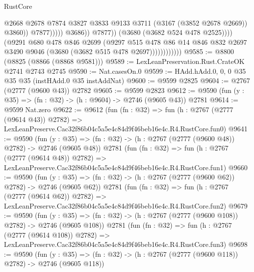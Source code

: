 \begin{lexlean}{RustCore}
\begin{coremodule}
                                              @2668
                                              @2678
                                              @7874
                                              @3827
                                              @3833
                                              @9133
                                              @3711
                                              (@3167 (@3852 @2678 @2669))
                                              @3860))
                                          @7877)))))
                                @3686))
                            @7877))
                        (@3680 (@3682 @524 @478 @2525))))
                    (@9291
                      @680
                      @478
                      @846
                      @2699
                      (@9297
                        @515
                        @478
                        @86
                        @14
                        @846
                        @832
                        @2697
                        @3490
                        @9046
                        (@3680 (@3682 @515 @478 @2697))))))))))))
@9585 := @8800 (@8825 (@8866 (@8868 @9581)))
@9589 := LexLeanPreservation.Rust.CrateOK @2741 @2743 @2745
@9590 := Nat.casesOn.{0}
@9599 := HAdd.hAdd.{0, 0, 0} @35 @35 @35 (instHAdd.{0} @35 instAddNat)
@9600 := @9599 @2825
@9604 := @2767 (@2777 (@9600 @43)) @2782
@9605 := @9599 @2823
@9612 := @9590 (fun (y : @35) => (fn : @32) -> (h : @9604) -> @2746 (@9605 @43)) @2781
@9614 := @9599 Nat.zero
@9622 := @9612
    (fun (fn : @32) =>
    fun (h : @2767 (@2777 (@9614 @43)) @2782) =>
    LexLeanPreserve.Cac32f86b04c5a5e4c84d9f46beb16e4c.R4.RustCore.fun0)
@9641 := @9590
    (fun (y : @35) => (fn : @32) -> (h : @2767 (@2777 (@9600 @48)) @2782) -> @2746 (@9605 @48))
    @2781
    (fun (fn : @32) =>
    fun (h : @2767 (@2777 (@9614 @48)) @2782) =>
    LexLeanPreserve.Cac32f86b04c5a5e4c84d9f46beb16e4c.R4.RustCore.fun1)
@9660 := @9590
    (fun (y : @35) => (fn : @32) -> (h : @2767 (@2777 (@9600 @62)) @2782) -> @2746 (@9605 @62))
    @2781
    (fun (fn : @32) =>
    fun (h : @2767 (@2777 (@9614 @62)) @2782) =>
    LexLeanPreserve.Cac32f86b04c5a5e4c84d9f46beb16e4c.R4.RustCore.fun2)
@9679 := @9590
    (fun (y : @35) => (fn : @32) -> (h : @2767 (@2777 (@9600 @108)) @2782) -> @2746 (@9605 @108))
    @2781
    (fun (fn : @32) =>
    fun (h : @2767 (@2777 (@9614 @108)) @2782) =>
    LexLeanPreserve.Cac32f86b04c5a5e4c84d9f46beb16e4c.R4.RustCore.fun3)
@9698 := @9590
    (fun (y : @35) => (fn : @32) -> (h : @2767 (@2777 (@9600 @118)) @2782) -> @2746 (@9605 @118))

\end{coremodule}
\end{lexlean}
